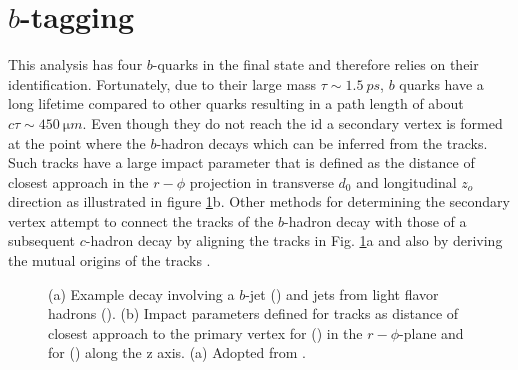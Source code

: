 \section{$b$-tagging}\label{sec:b_tagging}
This analysis has four $b$-quarks in the final state and therefore relies on their identification.  Fortunately, due to their large mass $\tau\sim\qty{1.5}{ps}$, $b$ quarks have a long lifetime compared to other quarks resulting in a path length of about $c\tau\sim\qty{450}{\micro m}$. Even though they do not reach the \ac{id} a secondary vertex is formed at the point where the $b$-hadron decays which can be inferred from the tracks. Such tracks have a large impact parameter that is defined as the distance of closest approach in the $r-\phi$ projection in transverse $d_0$ and longitudinal $z_o$ direction \citep{aad2008atlas} as illustrated in figure \ref{fig:secondary_vertex}b. Other methods for determining the secondary vertex attempt to connect the tracks of the $b$-hadron decay with those of a subsequent $c$-hadron decay by aligning the tracks in Fig. \ref{fig:secondary_vertex}a and also by deriving the mutual origins of the tracks \citep{ATL-PHYS-PUB-2017-013}. 

\begin{figure}[]
  \centering
  \caption{(a) Example decay involving a $b$-jet () and jets from light flavor hadrons (). (b) Impact parameters defined for tracks as distance of closest approach to the primary vertex for (\mbox{\color[HTML]{009245}{$d_0$}}) in the $r-\phi$-plane and for (\mbox{\color[HTML]{EC1C25}{$z_0$}}) along the z axis. (a) Adopted from \cite{Guth:2765038}.}
  \label{fig:secondary_vertex}
\end{figure} 
